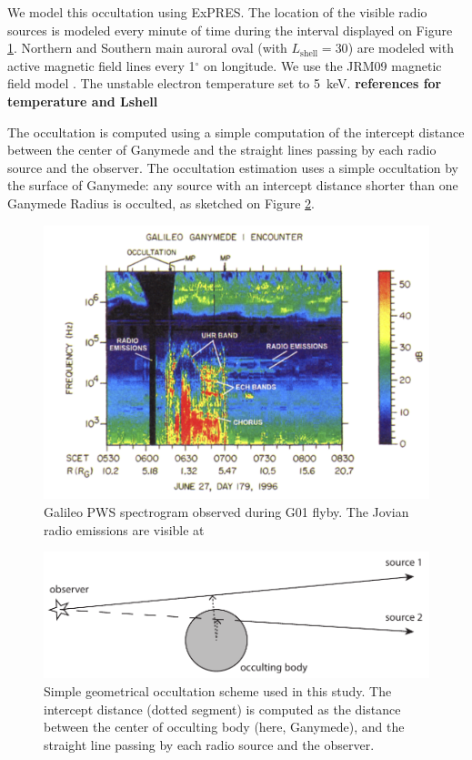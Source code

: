 \documentclass[referee]{aa}
\begin{document}
We model this occultation using ExPRES. The location of the visible radio sources is modeled every minute of time during the interval displayed on Figure \ref{fig:g01}. Northern and Southern main auroral oval (with $L_\textrm{shell}=30$) are modeled with active magnetic field lines every 1$^\circ$ on longitude. We use the JRM09 magnetic field model \citep{Connerney:2018jx}. The unstable electron temperature set to 5~keV. {\bf references for temperature and Lshell}

The occultation is computed using a simple computation of the intercept distance between the center of Ganymede and the straight lines passing by each radio source and the observer. The occultation estimation uses a simple occultation by the surface of Ganymede: any source with an intercept distance shorter than one Ganymede Radius is occulted, as sketched on Figure \ref{fig:occult}.


\begin{figure}
\includegraphics[width=\linewidth]{gll-g01.png}
\caption{Galileo PWS spectrogram observed during G01 flyby. The Jovian radio emissions are visible at }\label{fig:g01}
\end{figure}

\begin{figure}
\includegraphics[width=0.7\linewidth]{occult.pdf}
\caption{Simple geometrical occultation scheme used in this study. The intercept distance (dotted segment) is computed as the distance between the center of occulting body (here, Ganymede), and the straight line passing by each radio source and the observer.}\label{fig:occult}
\end{figure}


\end{document}
